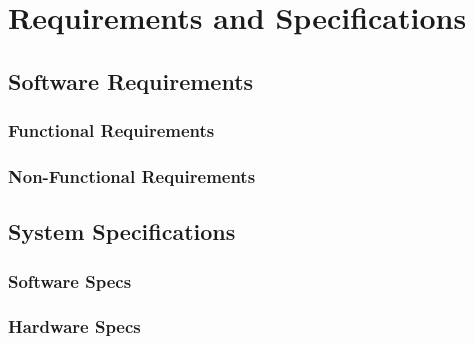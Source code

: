 \documentclass[../Report.tex]{subfiles}
\begin{document}
\chapter{Requirements and  Specifications}

\section{Software Requirements}

\subsection{Functional Requirements}

\subsection{Non-Functional Requirements}

\section{System Specifications}

\subsection{Software Specs}

\subsection{Hardware Specs}
\end{document}
